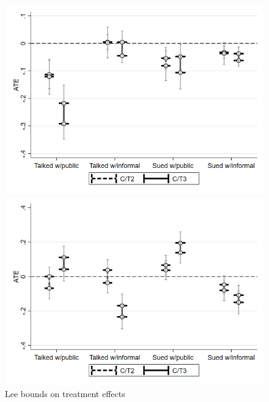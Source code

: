 \begin{figure}[H] 
  \centering
  \caption{Lee bounds on treatment effects}
  \begin{minipage}[b]{0.4\textwidth}
    \includegraphics[width=\textwidth]{Figures/A1_fig5_1.png}
  \end{minipage}
  \begin{minipage}[b]{0.4\textwidth}
    \includegraphics[width=\textwidth]{Figures/A1_fig5_2.png}
  \end{minipage}
  \label{fig:A1_fig5}
  \begin{figurenotes}

\end{figurenotes}
\end{figure}
